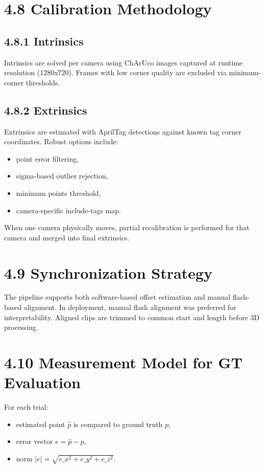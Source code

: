 \section{4.8 Calibration Methodology}
\subsection{4.8.1 Intrinsics}
Intrinsics are solved per camera using ChArUco images captured at runtime resolution (1280x720). Frames with low corner quality are excluded via minimum-corner thresholds.

\subsection{4.8.2 Extrinsics}
Extrinsics are estimated with AprilTag detections against known tag corner coordinates. Robust options include:
\begin{itemize}
  \item point error filtering,
  \item sigma-based outlier rejection,
  \item minimum points threshold,
  \item camera-specific include-tags map.
\end{itemize}

When one camera physically moves, partial recalibration is performed for that camera and merged into final extrinsics.

\section{4.9 Synchronization Strategy}
The pipeline supports both software-based offset estimation and manual flash-based alignment. In deployment, manual flash alignment was preferred for interpretability. Aligned clips are trimmed to common start and length before 3D processing.

\section{4.10 Measurement Model for GT Evaluation}
For each trial:
\begin{itemize}
  \item estimated point \(\hat{p}\) is compared to ground truth \(p\),
  \item error vector \(e=\hat{p}-p\),
  \item norm \(|e|=\sqrt{e\_x^2+e\_y^2+e\_z^2}\).
\end{itemize}

